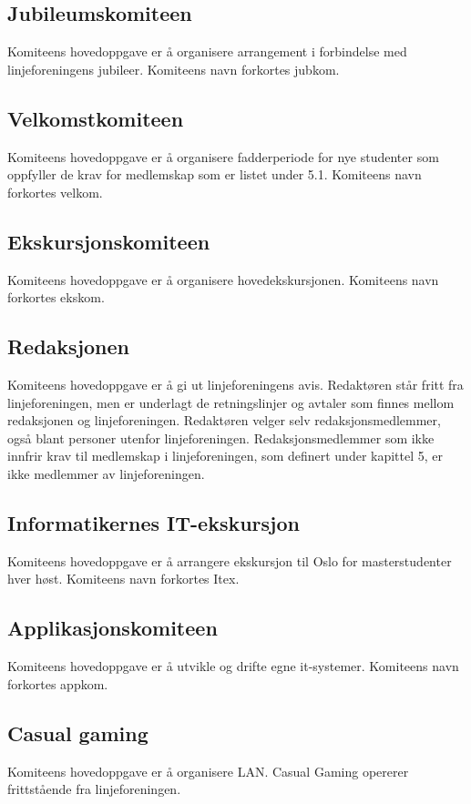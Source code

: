 \subsection{Jubileumskomiteen}{
Komiteens hovedoppgave er å organisere arrangement i forbindelse med linjeforeningens jubileer. Komiteens navn forkortes jubkom.

}

\subsection{Velkomstkomiteen}{
Komiteens hovedoppgave er å organisere fadderperiode for nye studenter som oppfyller de krav for medlemskap som er listet under 5.1. Komiteens navn forkortes velkom.
}

\subsection{Ekskursjonskomiteen}{
Komiteens hovedoppgave er å organisere hovedekskursjonen. Komiteens navn forkortes ekskom.
}
\subsection{Redaksjonen}{
Komiteens hovedoppgave er å gi ut linjeforeningens avis. Redaktøren står fritt fra linjeforeningen, men er underlagt de retningslinjer og avtaler som finnes mellom redaksjonen og linjeforeningen. Redaktøren velger selv redaksjonsmedlemmer, også blant personer utenfor linjeforeningen. Redaksjonsmedlemmer som ikke innfrir krav til medlemskap i linjeforeningen, som definert under kapittel 5, er ikke medlemmer av linjeforeningen.
}

\subsection{Informatikernes IT-ekskursjon}{
Komiteens hovedoppgave er å arrangere ekskursjon til Oslo for masterstudenter hver høst. Komiteens navn forkortes Itex.
}

\subsection{Applikasjonskomiteen}{
Komiteens hovedoppgave er å utvikle og drifte egne it-systemer. Komiteens navn forkortes appkom.
}

\subsection{Casual gaming}{
Komiteens hovedoppgave er å organisere LAN. Casual Gaming opererer frittstående fra linjeforeningen.
}


